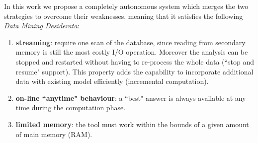 In this work we propose a completely autonomous system which merges the two strategies to overcome their weaknesses, meaning that it satisfies the following \emph{Data Mining Desiderata}:
\begin{enumerate}
    \item \textbf{streaming}: require one scan of the database, since reading from secondary memory is still the most costly I/O operation.
    Moreover the analysis can be stopped and restarted without having to re-process the whole data (``stop and resume" support).
    This property adds the capability to incorporate additional data with existing model efficiently (incremental computation).
    \item \textbf{on-line ``anytime" behaviour}: a ``best" answer is always available at any time during the computation phase.
    \item \textbf{limited memory}: the tool must work within the bounds of a given amount of main memory (RAM).
\end{enumerate}

